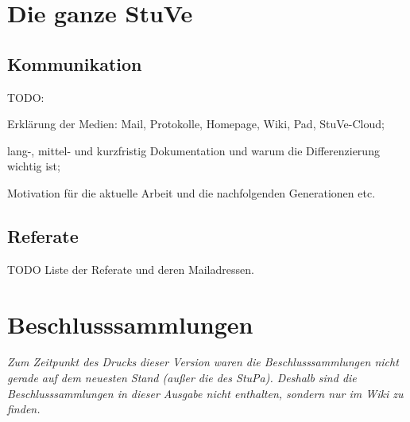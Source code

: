 \documentclass[
	10pt,
	a5paper,
	twoside
	]
	{book}
\begin{document}
\chapter{Die ganze StuVe}

\clearpage

\section{Kommunikation}

TODO:

Erklärung der Medien: Mail, Protokolle, Homepage, Wiki, Pad, StuVe-Cloud;

lang-, mittel- und kurzfristig Dokumentation und warum die Differenzierung wichtig ist;

Motivation für die aktuelle Arbeit und die nachfolgenden Generationen etc.


\clearpage
\section{Referate}

TODO Liste der Referate und deren Mailadressen.

\cleardoublepage


\chapter{Beschlusssammlungen}


\textit{Zum Zeitpunkt des Drucks dieser Version waren die Beschlusssammlungen nicht gerade auf dem neuesten Stand (außer die des StuPa). Deshalb sind die Beschlusssammlungen in dieser Ausgabe nicht enthalten, sondern nur im Wiki zu finden.}





%
%

%
%
%
%
%
%
%
\end{document}
